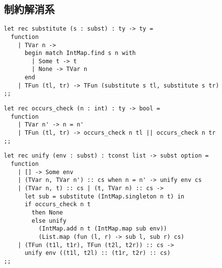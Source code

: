 \subsection{制約解消系}

\begin{lstlisting}[caption=代入, label=list:ocaml-stlc-substitute]
let rec substitute (s : subst) : ty -> ty =
  function
    | TVar n ->
      begin match IntMap.find s n with
        | Some t -> t
        | None -> TVar n
      end
    | TFun (tl, tr) -> TFun (substitute s tl, substitute s tr)
;;
\end{lstlisting}

\begin{lstlisting}[caption=出現検査, label=list:ocaml-stlc-occurs-check]
let rec occurs_check (n : int) : ty -> bool =
  function
    | TVar n' -> n = n'
    | TFun (tl, tr) -> occurs_check n tl || occurs_check n tr
;;
\end{lstlisting}

\begin{lstlisting}[caption=方程式を解く関数, label=list:ocaml-stlc-solve]
let rec unify (env : subst) : tconst list -> subst option =
  function
    | [] -> Some env
    | (TVar n, TVar n') :: cs when n = n' -> unify env cs
    | (TVar n, t) :: cs | (t, TVar n) :: cs ->
      let sub = substitute (IntMap.singleton n t) in
      if occurs_check n t
        then None
        else unify
          (IntMap.add n t (IntMap.map sub env))
          (List.map (fun (l, r) -> sub l, sub r) cs)
    | (TFun (t1l, t1r), TFun (t2l, t2r)) :: cs ->
      unify env ((t1l, t2l) :: (t1r, t2r) :: cs)
;;
\end{lstlisting}

